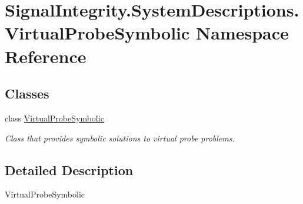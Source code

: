 \hypertarget{namespaceSignalIntegrity_1_1SystemDescriptions_1_1VirtualProbeSymbolic}{}\section{Signal\+Integrity.\+System\+Descriptions.\+Virtual\+Probe\+Symbolic Namespace Reference}
\label{namespaceSignalIntegrity_1_1SystemDescriptions_1_1VirtualProbeSymbolic}
\subsection*{Classes}
\begin{DoxyCompactItemize}
\item 
class \hyperlink{classSignalIntegrity_1_1SystemDescriptions_1_1VirtualProbeSymbolic_1_1VirtualProbeSymbolic}{Virtual\+Probe\+Symbolic}
\begin{DoxyCompactList}\small\item\em Class that provides symbolic solutions to virtual probe problems. \end{DoxyCompactList}\end{DoxyCompactItemize}


\subsection{Detailed Description}
\begin{DoxyVerb}VirtualProbeSymbolic\end{DoxyVerb}
 
